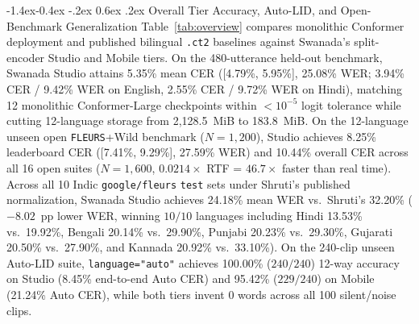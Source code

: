 \documentclass[10pt,twocolumn]{article}
\makeatletter
\renewcommand\subsection{\@startsection{subsection}{2}{\z@}%
  {-1.4ex\@plus -0.4ex \@minus -.2ex}%
  {0.6ex \@plus .2ex}%
  {\normalfont\normalsize\bfseries}}
\makeatother
\begin{document}
\subsection{Overall Tier Accuracy, Auto-LID, and Open-Benchmark Generalization}
Table~\ref{tab:overview} compares monolithic Conformer deployment and published bilingual \texttt{.ct2} baselines against Swanada's split-encoder Studio and Mobile tiers. On the 480-utterance held-out benchmark, Swanada Studio attains 5.35\% mean CER ([4.79\%, 5.95\%], 25.08\% WER; 3.94\% CER / 9.42\% WER on English, 2.55\% CER / 9.72\% WER on Hindi), matching 12 monolithic Conformer-Large checkpoints within $< 10^{-5}$ logit tolerance while cutting 12-language storage from 2,128.5~MiB to 183.8~MiB. On the 12-language unseen open \texttt{FLEURS}+Wild benchmark ($N = 1{,}200$), Studio achieves 8.25\% leaderboard CER ([7.41\%, 9.29\%], 27.59\% WER) and 10.44\% overall CER across all 16 open suites ($N = 1{,}600$, $0.0214\times$ RTF = $46.7\times$ faster than real time). Across all 10 Indic \texttt{google/fleurs} \texttt{test} sets under Shruti's published normalization, Swanada Studio achieves 24.18\% mean WER vs.\ Shruti's 32.20\% ($-8.02$~pp lower WER, winning $10/10$ languages including Hindi 13.53\% vs.\ 19.92\%, Bengali 20.14\% vs.\ 29.90\%, Punjabi 20.23\% vs.\ 29.30\%, Gujarati 20.50\% vs.\ 27.90\%, and Kannada 20.92\% vs.\ 33.10\%). On the 240-clip unseen Auto-LID suite, \texttt{language="auto"} achieves 100.00\% ($240/240$) 12-way accuracy on Studio (8.45\% end-to-end Auto CER) and 95.42\% ($229/240$) on Mobile (21.24\% Auto CER), while both tiers invent $0$ words across all 100 silent/noise clips.
\end{document}
